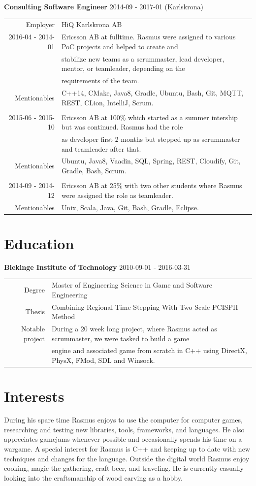 \documentclass[a4paper,10pt]{article}
\begin{document}
\textbf{Consulting Software Engineer} 2014-09 - 2017-01 (Karlskrona) \\
\begin{tabular}{rl}
Employer& HiQ Karlskrona AB\\
2016-04 - 2014-01& Ericsson AB at fulltime. Rasmus were assigned to various PoC projects and helped to create and\\& stabilize new teams as a scrummaster, lead developer, mentor, or teamleader, depending on the\\& requirements of the team. \\
Mentionables& C++14, CMake, Java8, Gradle, Ubuntu, Bash, Git, MQTT, REST, CLion, IntelliJ, Scrum.\\\\

2015-06 - 2015-10&Ericsson AB at 100\% which started as a summer intership but was continued. Rasmus had the role\\& as developer first 2 months but stepped up as scrummaster and teamleader after that. \\
Mentionables& Ubuntu, Java8, Vaadin, SQL, Spring, REST, Cloudify, Git, Gradle, Bash, Scrum.\\\\

2014-09 - 2014-12& Ericsson AB at 25\% with two other students where Rasmus were assigned the role as teamleader.\\
Mentionables& Unix, Scala, Java, Git, Bash, Gradle, Eclipse.
\end{tabular}

\section{Education}
\textbf{Blekinge Institute of Technology} 2010-09-01 - 2016-03-31 \\
\begin{tabular}{rl}
Degree&  Master of Engineering Science in Game and Software Engineering\\
Thesis& Combining Regional Time Stepping With Two-Scale PCISPH Method\\
Notable project& During a 20 week long project, where Rasmus acted  as scrummaster, we were tasked to build a game\\& engine and associated game from scratch in C++ using DirectX, PhysX, FMod, SDL and Winsock.
\end{tabular}

\section{Interests}
During his spare time Rasmus enjoys to use the computer for computer games, researching and testing new libraries, tools, frameworks, and languages. He also appreciates gamejams whenever possible and occasionally spends his time on a wargame. A special interest for Rasmus is C++ and keeping up to date with new techniques and changes for the language. Outside the digital world Rasmus enjoy cooking, magic the gathering, craft beer, and traveling. He is currently casually looking into the craftsmanship of wood carving as a hobby.
\end{document}
